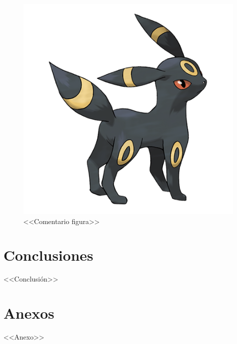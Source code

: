 \begin{multicols}{2}
\begin{figure}[H]
\centering
\includegraphics[scale=0.32]{pollito.png}
\caption{<<Comentario figura>>}
\label{key_figura}
\end{figure}

\section{Conclusiones}

<<Conclusión>>

\printbibliography

\end{multicols}

\section{Anexos}

<<Anexo>>

